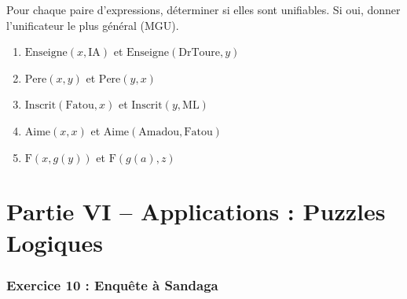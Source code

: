 \documentclass[11pt,a4paper]{article}
\begin{document}
\begin{exercice}
Pour chaque paire d'expressions, déterminer si elles sont unifiables. Si oui, donner l'unificateur le plus général (MGU).

\begin{enumerate}
    \item $\text{Enseigne}(x, \text{IA})$ et $\text{Enseigne}(\text{DrToure}, y)$
    \item $\text{Pere}(x, y)$ et $\text{Pere}(y, x)$
    \item $\text{Inscrit}(\text{Fatou}, x)$ et $\text{Inscrit}(y, \text{ML})$
    \item $\text{Aime}(x, x)$ et $\text{Aime}(\text{Amadou}, \text{Fatou})$
    \item $\text{F}(x, g(y))$ et $\text{F}(g(a), z)$
\end{enumerate}
\end{exercice}

\part*{Partie VI -- Applications : Puzzles Logiques}

\section*{Exercice 10 : Enquête à Sandaga}
\end{document}
